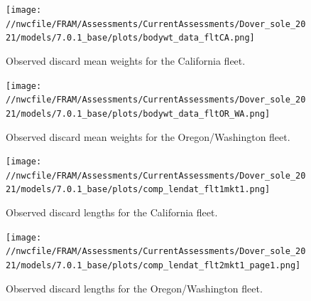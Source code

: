 \documentclass[11pt,
  english,
  a4paper,
]{article}
\begin{document}
\tagmcend\tagstructend


\begin{figure}
\centering
\texttt{[image: //nwcfile/FRAM/Assessments/CurrentAssessments/Dover\_sole\_2021/models/7.0.1\_base/plots/bodywt\_data\_fltCA.png]}
\caption{Observed discard mean weights for the California fleet.\label{fig:ca-disc-wght-ob}}
\end{figure}

\tagmcend\tagstructend


\begin{figure}
\centering
\texttt{[image: //nwcfile/FRAM/Assessments/CurrentAssessments/Dover\_sole\_2021/models/7.0.1\_base/plots/bodywt\_data\_fltOR\_WA.png]}
\caption{Observed discard mean weights for the Oregon/Washington fleet.\label{fig:orwa-disc-wght-ob}}
\end{figure}

\tagmcend\tagstructend


\begin{figure}
\centering
\texttt{[image: //nwcfile/FRAM/Assessments/CurrentAssessments/Dover\_sole\_2021/models/7.0.1\_base/plots/comp\_lendat\_flt1mkt1.png]}
\caption{Observed discard lengths for the California fleet.\label{fig:ca-disc-len-ob}}
\end{figure}

\tagmcend\tagstructend


\begin{figure}
\centering
\texttt{[image: //nwcfile/FRAM/Assessments/CurrentAssessments/Dover\_sole\_2021/models/7.0.1\_base/plots/comp\_lendat\_flt2mkt1\_page1.png]}
\caption{Observed discard lengths for the Oregon/Washington fleet.\label{fig:orwa-disc-len-ob-1}}
\end{figure}

\tagmcend\tagstructend

\end{document}
